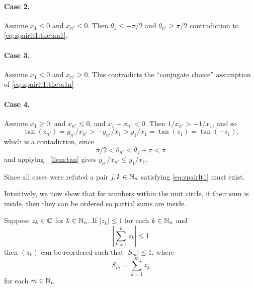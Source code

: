 \begin{thmproof}
\paragraph{Case 2.} Assume \(x_1\leq 0\) and \(x_{n'}\leq 0\).
Then
\(\theta_1 \leq -\pi/2\) and \(\theta_{n'} \geq \pi/2\)
contradiction to \eqref{eq:zpairlt1:thetan1}.
\paragraph{Case 3.} Assume \(x_1\leq 0\) and \(x_{n'}\geq 0\).
This contradicts the ``conjugate choice'' 
assumption of \eqref{eq:zpairlt1:theta1n}
\paragraph{Case 4.} Assume \(x_1\geq 0\), and \(x_{n'}\leq 0\),
and \(x_1 + x_{n'} < 0\).
Then
\(1/x_{n'} > -1/x_1\), and so
\begin{equation*}
\tan(z_{n'}) =  y_{n'}/x_{n'} > -y_{n'}/x_1 > y_1 / x_1 = \tan(z_1) = \tan(-z_1).
\end{equation*}
which is a contadiction, since 
\begin{equation*}
\pi/2 < \theta_{n'} < \theta_1 + \pi < \pi
\end{equation*}
and applying \loclemma~\ref{llem:tan} gives \(y_{n'}/x_{n'} \leq y_1/x_1\).

Since all cases were refuted a pair \(j,k\in\mathbb{N}_n\)
satisfying \eqref{eq:zpairlt1} must exist.
\end{thmproof}



Intuitively, we now show that for numbers within the unit circle,
if their sum is inside, then they can be ordered so partial sums are inside.
\begin{llem} \label{llem:zsubsum}
Suppose \(z_k\in\mathbb{C}\) for \(k\in\mathbb{N}_n\). %
If \(|z_k| \leq 1\) for each \(k\in \mathbb{N}_n\) and 
\begin{equation} \label{eq:zsubsum:assert}
\left|\sum_{k=1}^n z_k\right| \leq 1
\end{equation}
then \((z_k)\) can be reordered such that \(|S_m| \leq 1\), where
\begin{equation*}
S_m = \sum_{k=1}^m z_k
\end{equation*}
for each \(m\in\mathbb{N}_n\).
\end{llem}

